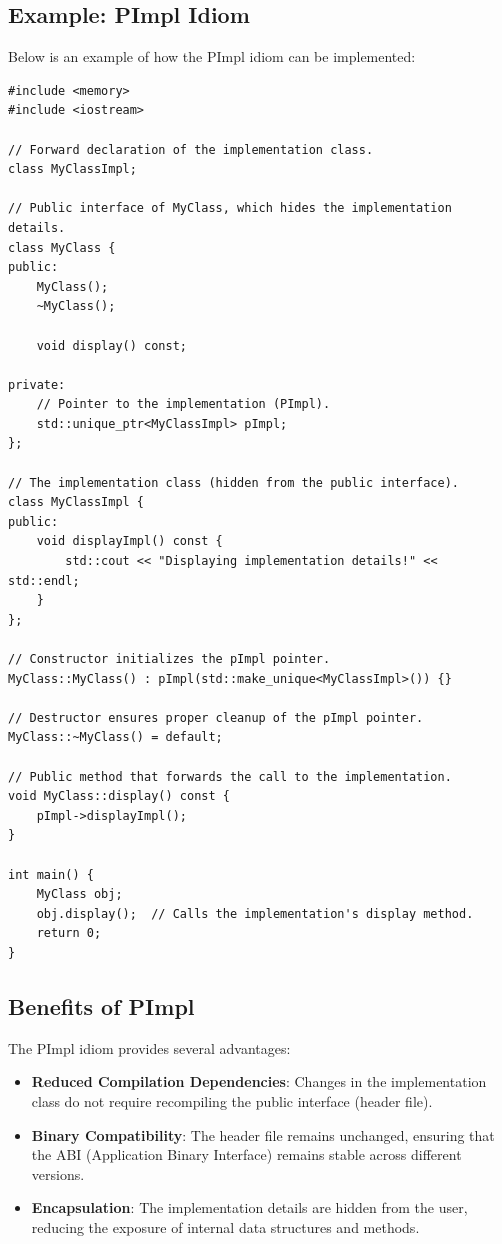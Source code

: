 \subsection{Example: PImpl Idiom}

Below is an example of how the PImpl idiom can be implemented:

\begin{lstlisting}
#include <memory>
#include <iostream>

// Forward declaration of the implementation class.
class MyClassImpl;

// Public interface of MyClass, which hides the implementation details.
class MyClass {
public:
    MyClass();
    ~MyClass();

    void display() const;

private:
    // Pointer to the implementation (PImpl).
    std::unique_ptr<MyClassImpl> pImpl;
};

// The implementation class (hidden from the public interface).
class MyClassImpl {
public:
    void displayImpl() const {
        std::cout << "Displaying implementation details!" << std::endl;
    }
};

// Constructor initializes the pImpl pointer.
MyClass::MyClass() : pImpl(std::make_unique<MyClassImpl>()) {}

// Destructor ensures proper cleanup of the pImpl pointer.
MyClass::~MyClass() = default;

// Public method that forwards the call to the implementation.
void MyClass::display() const {
    pImpl->displayImpl();
}

int main() {
    MyClass obj;
    obj.display();  // Calls the implementation's display method.
    return 0;
}
\end{lstlisting}

\subsection{Benefits of PImpl}
The PImpl idiom provides several advantages:
\begin{itemize}
    \item \textbf{Reduced Compilation Dependencies}: Changes in the implementation class do not require recompiling the public interface (header file).
    \item \textbf{Binary Compatibility}: The header file remains unchanged, ensuring that the ABI (Application Binary Interface) remains stable across different versions.
    \item \textbf{Encapsulation}: The implementation details are hidden from the user, reducing the exposure of internal data structures and methods.
\end{itemize}


